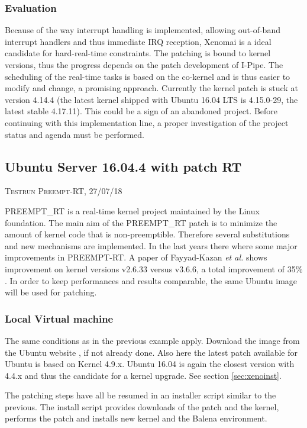 \documentclass[]{scrartcl}
\begin{document}
\subsubsection{Evaluation}

Because of the way interrupt handling is implemented, allowing out-of-band interrupt handlers and thus immediate IRQ reception, Xenomai is a ideal candidate for hard-real-time constraints. The patching is bound to kernel versions, thus the progress depends on the patch development of I-Pipe. 
The scheduling of the real-time tasks is based on the co-kernel and is thus easier to modify and change, a promising approach.
Currently the kernel patch is stuck at version 4.14.4 (the latest kernel shipped with Ubuntu 16.04 LTS is 4.15.0-29, the latest stable 4.17.11). This could be a sign of an abandoned project. Before continuing with this implementation line, a proper investigation of the project status and agenda must be performed.

\subsection{Ubuntu Server 16.04.4 with patch RT}

{\small\textsc{Testrun Preempt-RT, 27/07/18} \bigskip}

PREEMPT\_RT is a real-time kernel project maintained by the Linux foundation. 
The main aim of the PREEMPT\_RT patch is to minimize the amount of kernel code that is non-preemptible. Therefore several substitutions and new mechanisms are implemented.
In the last years there where some major improvements in PREEMPT-RT. A paper of Fayyad-Kazan \textit{et al.} shows improvement on kernel versions v2.6.33 versus v3.6.6, a total improvement of 35\% \cite{Fayyad-Kazanetal2014}. In order to keep performances and results comparable, the same Ubuntu image will be used for patching.

\subsubsection{Local Virtual machine}

The same conditions as in the previous example apply. Download the image from the Ubuntu website \cite{ubuntu02}, if not already done. Also here the latest patch available for Ubuntu is based on Kernel 4.9.x. Ubuntu 16.04 is again the closest version with 4.4.x and thus the candidate for a kernel upgrade. See section \ref{sec:xenoinst}.

The patching steps have all be resumed in an installer script similar to the previous. The install script provides downloads of the patch and the kernel, performs the patch and installs new kernel and the Balena environment.
\end{document}
